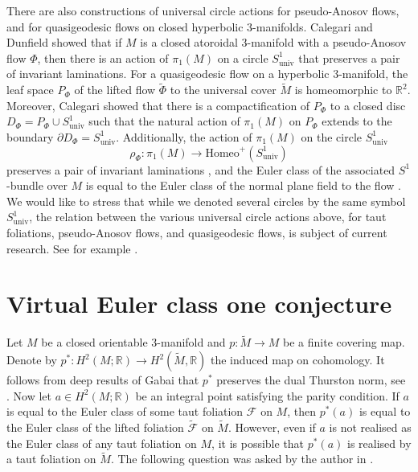 \documentclass[11pt]{amsart}
\theoremstyle{remark}
\theoremstyle{definition}
\begin{document}
	 There are also constructions of universal circle actions for pseudo-Anosov flows, and for quasigeodesic flows on closed hyperbolic 3-manifolds. Calegari and Dunfield \cite{calegari2003laminations} showed that if $M$ is a closed atoroidal 3-manifold with a pseudo-Anosov flow $\Phi$, then there is an action of $\pi_1(M)$ on a circle $S^1_{\mathrm{univ}}$ that preserves a pair of invariant laminations. For a quasigeodesic flow on a hyperbolic 3-manifold, the leaf space $P_\Phi$ of the lifted flow $\tilde{\Phi}$ to the universal cover $\tilde{M}$ is homeomorphic to $\mathbb{R}^2$. Moreover, Calegari \cite[Remark 5.2]{calegari2006universal} showed that there is a compactification of $P_\Phi$ to a closed disc $D_\Phi  = P_\Phi \cup S^1_\mathrm{univ}$ such that the natural action of $\pi_1(M)$ on $P_\Phi$ extends to the boundary $\partial D_\Phi =  S^1_\mathrm{univ}$. Additionally, the action of $\pi_1(M)$ on the circle $S^1_{\mathrm{univ}}$ 
	\[ \rho_\Phi \colon \pi_1(M) \rightarrow \mathrm{Homeo}^+(S^1_{\mathrm{univ}})  \]
	preserves a pair of invariant laminations \cite[Theorem A]{calegari2001leafwise}, and the Euler class of the associated $S^1$-bundle over $M$ is equal to the Euler class of the normal plane field to the flow \cite[Lemma 6.4]{calegari2001leafwise}. We would like to stress that while we denoted several circles by the same symbol $S^1_{\mathrm{univ}}$, the relation between the various universal circle actions above, for taut foliations, pseudo-Anosov flows, and quasigeodesic flows, is subject of current research. See for example \cite{huang2024depth, landry2024simultaneous}. 
	
	
	\section{Virtual Euler class one conjecture}
	
	\label{sec: virtual}
	
	Let $M$ be a closed orientable 3-manifold and $p \colon \tilde{M} \rightarrow M$ be a finite covering map. Denote by $p^* \colon H^2(M; \mathbb{R}) \rightarrow H^2(\tilde{M}, \mathbb{R})$ the induced map on cohomology. It follows from deep results of Gabai \cite{gabai1983foliations} that $p^*$ preserves the dual Thurston norm, see \cite[Proposition 2.20]{yazdi2020thurston}. Now let $a \in H^2(M ; \mathbb{R})$ be an integral point satisfying the parity condition. If $a$ is equal to the Euler class of some taut foliation $\mathcal{F}$ on $M$, then $p^*(a)$ is equal to the Euler class of the lifted foliation $\tilde{\mathcal{F}}$ on $\tilde{M}$. However, even if $a$ is not realised as the Euler class of any taut foliation on $M$, it is possible that $p^*(a)$ is realised by a taut foliation on $\tilde{M}$. The following question was asked by the author in \cite{yazdi2020thurston}. 
	
\end{document}
